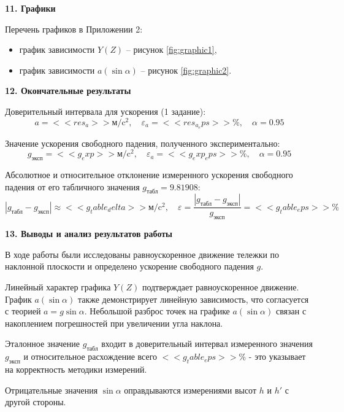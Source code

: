 \documentclass[14pt]{extreport}
\begin{document}
\noindent\textbf{11. Графики }

Перечень графиков в Приложении 2: 
\begin{itemize}
    \item график зависимости $Y(Z)$ -- рисунок \ref{fig:graphic1},
    \item график зависимости $a(\sin\alpha)$ -- рисунок \ref{fig:graphic2}.
\end{itemize}

\newpage
\noindent\textbf{12. Окончательные результаты}

Доверительный интервала для ускорения (1 задание):
\begin{equation*}
a = <<res_a>>\text{м}/\text{c}^2, \quad \varepsilon_a = <<res_a_eps>>\%, \quad \alpha=0.95
\end{equation*}

Значение ускорения свободного падения, полученного экспериментально:
\begin{equation*}
g_\text{эксп} = <<g_exp>>\text{м}/\text{c}^2, \quad \varepsilon_a = <<g_exp_eps>>\%, \quad \alpha=0.95
\end{equation*}

Абсолютное и относительное отклонение измеренного ускорения свободного падения от его табличного значения $g_\text{табл} = 9.81908$:
\begin{equation*}
|g_\text{табл} - g_\text{эксп}| \approx <<g_table_delta>>\text{м}/\text{c}^2, \quad \varepsilon = \frac{|g_\text{табл} - g_\text{эксп}|}{g_\text{эксп}} = <<g_table_eps>>\%
\end{equation*}

\noindent\textbf{13. Выводы и анализ результатов работы}

В ходе работы были исследованы равноускоренное движение тележки по наклонной плоскости и определено ускорение свободного падения $g$.

Линейный характер графика $Y(Z)$ подтверждает равноускоренное движение. График $a(\sin\alpha)$ также демонстрирует линейную зависимость, что согласуется с теорией $a=g\sin\alpha$. Небольшой разброс точек на графике $a(\sin\alpha)$ связан с накоплением погрешностей при увеличении угла наклона.

Эталонное значение $g_\text{табл}$ входит в доверительный интервал измеренного значения $g_\text{эксп}$ и относительное расхождение всего $<<g_table_eps>>\%$ - это указывает на корректность методики измерений.

Отрицательные значения $\sin\alpha$ оправдываются измерениями высот $h$ и $h'$ с другой стороны.
\end{document}
